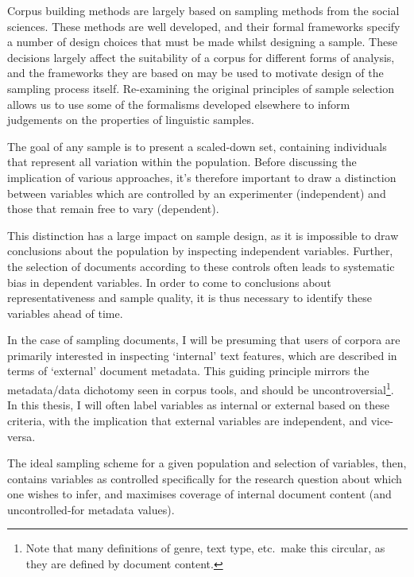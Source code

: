 

Corpus building methods are largely based on sampling methods from the social sciences.  These methods are well developed, and their formal frameworks specify a number of design choices that must be made whilst designing a sample.  
These decisions largely affect the suitability of a corpus for different forms of analysis, and the frameworks they are based on may be used to motivate design of the sampling process itself.
Re-examining the original principles of sample selection allows us to use some of the formalisms developed elsewhere to inform judgements on the properties of linguistic samples.

The goal of any sample is to present a scaled-down set, containing individuals that represent all variation within the population.  Before discussing the implication of various approaches, it's therefore important to draw a distinction between variables which are controlled by an experimenter (independent) and those that remain free to vary (dependent).

This distinction has a large impact on sample design, as it is impossible to draw conclusions about the population by inspecting independent variables.  Further, the selection of documents according to these controls often leads to systematic bias in dependent variables.  In order to come to conclusions about representativeness and sample quality, it is thus necessary to identify these variables ahead of time.

In the case of sampling documents, I will be presuming that users of corpora are primarily interested in inspecting `internal' text features, which are described in terms of `external' document metadata.  This guiding principle mirrors the metadata/data dichotomy seen in corpus tools, and should be uncontroversial\footnote{Note that many definitions of genre, text type, etc.\ make this circular, as they are defined by document content.}.  In this thesis, I will often label variables as internal or external based on these criteria, with the implication that external variables are independent, and vice-versa.

The ideal sampling scheme for a given population and selection of variables, then, contains variables as controlled specifically for the research question about which one wishes to infer, and maximises coverage of internal document content (and uncontrolled-for metadata values).

